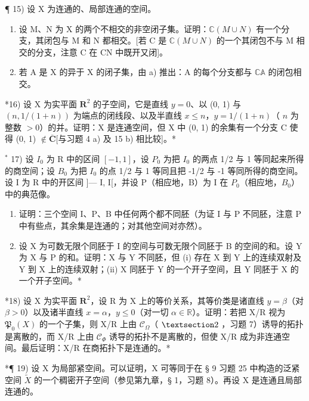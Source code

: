 ¶ 15) 设 X 为连通的、局部连通的空间。

\begin{enumerate}
\def\labelenumi{\alph{enumi})}
\item
  设 M、N 为 X 的两个不相交的非空闭子集。证明：\(\mathbb{C}(M \cup N)\) 有一个分支，其闭包与 M 和 N 都相交。{[}若 C 是 \(\mathbb{C}(M \cup N)\) 的一个其闭包不与 M 相交的分支，注意 C 在 CN 中既开又闭{]}。
\item
  若 A 是 X 的异于 X 的闭子集，由 a) 推出：A 的每个分支都与 \(\mathbb{C}\mathbb{A}\) 的闭包相交。
\end{enumerate}

*16) 设 X 为实平面 \(\mathbf{R}^2\) 的子空间，它是直线 \(y = 0\)、以 (0, 1) 与 \((n, 1/(1 + n))\) 为端点的闭线段、以及半直线 \(x \leqslant n\)，\(y = 1/(1 + n)\)（ \(n\) 为整数 \(>0\)）的并。证明：X 是连通空间，但 X 中 (0, 1) 的余集有一个分支 C 使得 (0, 1) \(\notin \overline{\mathbf{C}}\){[}与习题 4 a) 及 15 b) 相比较{]}。*

\(^{*}\) 17) 设 \(I_{0}\) 为 R 中的区间 \([-1,1]\)，设 \(P_{0}\) 为把 \(I_{0}\) 的两点 1/2 与 1 等同起来所得的商空间；设 \(B_{0}\) 为把 \(I_{0}\) 的点 1/2 与 1 等同且把 -1/2 与 -1 等同所得的商空间。设 I 为 R 中的开区间 {]}--- I, I{[}，并设 P（相应地，B）为 I 在 \(P_{0}\)（相应地，\(B_{0}\)）中的典范像。

\begin{enumerate}
\def\labelenumi{\alph{enumi})}
\item
  证明：三个空间 I、P、B 中任何两个都不同胚（为证 I 与 P 不同胚，注意 P 中有些点，其余集是连通的；对其他空间对亦然）。
\item
  设 X 为可数无限个同胚于 I 的空间与可数无限个同胚于 B 的空间的和。设 Y 为 X 与 P 的和。证明：X 与 Y 不同胚，但 (i) 存在 X 到 Y 上的连续双射及 Y 到 X 上的连续双射；(ii) X 同胚于 Y 的一个开子空间，且 Y 同胚于 X 的一个开子空间。*
\end{enumerate}

*18) 设 X 为实平面 \(\mathbf{R}^2\)，设 R 为 X 上的等价关系，其等价类是诸直线 \(y = \beta\)（对 \(\beta > 0\)）以及诸半直线 \(x = \alpha\)，\(y \leqslant 0\)（对一切 \(\alpha \in \mathbb{R}\)）。证明：若把 X/R 视为 \(\mathfrak{P}_0(X)\) 的一个子集，则 X/R 上由 \(\mathcal{C}_{\Omega}\)（ \(\S 2\) ，习题 7）诱导的拓扑是离散的，而 X/R 上由 \(\mathcal{C}_{\Phi}\) 诱导的拓扑不是离散的，但使 X/R 成为非连通空间。最后证明：X/R 在商拓扑下是连通的。*

*¶ 19) 设 X 为局部紧空间。可以证明，X 可等同于在 § 9 习题 25 中构造的泛紧空间 \(\tilde{X}\) 的一个稠密开子空间（参见第九章，§ 1，习题 8）。再设 X 是连通且局部连通的。

